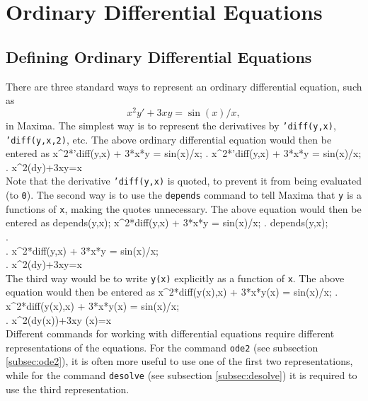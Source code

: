 
\section{Ordinary Differential Equations}

\subsection{Defining Ordinary Differential Equations}

There are three standard ways to represent an ordinary differential
equation, such as 
$$ x^2y'+3xy=\sin(x)/x,$$
in Maxima.  The simplest way is to represent the derivatives by
\texttt{'diff(y,x)},\\
\texttt{'diff(y,x,2)}, etc.  The above ordinary
differential equation would then be entered as
\beginmaximasession
x^2*'diff(y,x) + 3*x*y = sin(x)/x;
\maximatexsession
{}.  x^2*'diff(y,x) + 3*x*y = sin(x)/x; \\
.   x^{2}\*\left({{d}}\*y\right)+3\*x\*y={{\sin x}} \\
\endmaximasession
\noindent
Note that the derivative \texttt{'diff(y,x)} is quoted, to prevent it
from being evaluated (to \texttt{0}).  
The second way is to use the \texttt{depends} command to tell Maxima
that \texttt{y} is a functions of \texttt{x}, making the quotes
unnecessary.   The above equation would then be entered as
\beginmaximasession
depends(y,x);
x^2*diff(y,x) + 3*x*y = sin(x)/x;
\maximatexsession
{}.  depends(y,x); \\
.     \\
.  x^2*diff(y,x) + 3*x*y = sin(x)/x; \\
.   x^{2}\*\left({{d}}\*y\right)+3\*x\*y={{\sin x}} \\
\endmaximasession
\noindent
The third way would be to write \texttt{y(x)} explicitly as a function
of \texttt{x}.  The above equation would then be entered as
\beginmaximasession
x^2*diff(y(x),x) + 3*x*y(x) = sin(x)/x;
\maximatexsession
{}.  x^2*diff(y(x),x) + 3*x*y(x) = sin(x)/x; \\
.   x^{2}\*\left({{d}}\*y\left(x\right)\right)+3\*x\*y
 \left(x\right)={{\sin x}} \\
\endmaximasession
\noindent
Different commands for working with differential equations require
different representations of the equations.  For the command
\texttt{ode2} (see subsection \ref{subsec:ode2}), it is often more useful
to use one of the first two representations, while for the command 
\texttt{desolve} (see subsection \ref{subsec:desolve})
it is required to use the third representation.

